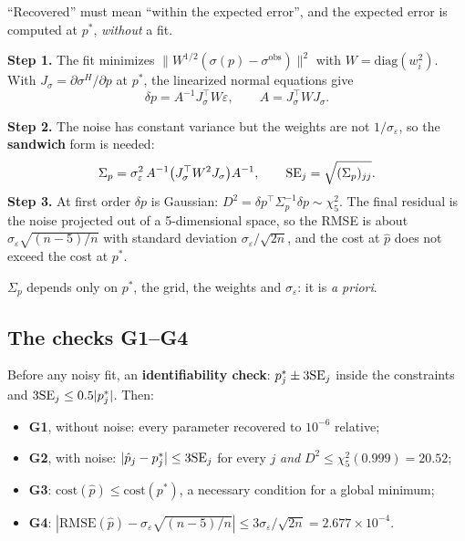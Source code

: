 ``Recovered'' must mean ``within the expected error'', and the expected error is computed at $p^*$, \emph{without} a
fit.

\noindent\textbf{Step 1.} The fit minimizes $\|W^{1/2}(\sigma(p)-\sigma^{\mathrm{obs}})\|^2$ with
$W=\mathrm{diag}(w_i^2)$. With $J_\sigma=\partial\sigma^H/\partial p$ at $p^*$, the linearized normal equations give
\[
\delta p=A^{-1}J_\sigma^\top W\varepsilon,\qquad A=J_\sigma^\top WJ_\sigma .
\]

\noindent\textbf{Step 2.} The noise has constant variance but the weights are not $1/\sigma_\varepsilon$, so the
\textbf{sandwich} form is needed:
\begin{equation}\label{eq:cal-sandwich}
\Sigma_p=\sigma_\varepsilon^2\,A^{-1}\big(J_\sigma^\top W^2J_\sigma\big)A^{-1},\qquad \mathrm{SE}_j=\sqrt{(\Sigma_p)_{jj}}.
\end{equation}
\noindent\textbf{Step 3.} At first order $\delta p$ is Gaussian: $D^2=\delta p^\top\Sigma_p^{-1}\delta p\sim\chi^2_5$.
The final residual is the noise projected out of a 5-dimensional space, so the RMSE is about
$\sigma_\varepsilon\sqrt{(n-5)/n}$ with standard deviation $\sigma_\varepsilon/\sqrt{2n}$, and the cost at $\hat p$
does not exceed the cost at $p^*$.

$\Sigma_p$ depends only on $p^*$, the grid, the weights and $\sigma_\varepsilon$: it is \emph{a priori}.

\subsection{The checks G1--G4}
Before any noisy fit, an \textbf{identifiability check}: $p^*_j\pm3\mathrm{SE}_j$ inside the constraints and
$3\mathrm{SE}_j\le0.5|p^*_j|$. Then:
\begin{itemize}
\item \textbf{G1}, without noise: every parameter recovered to $10^{-6}$ relative;
\item \textbf{G2}, with noise: $|\hat p_j-p^*_j|\le3\mathrm{SE}_j$ for every $j$ \emph{and} $D^2\le\chi^2_5(0.999)=20.52$;
\item \textbf{G3}: $\text{cost}(\hat p)\le\text{cost}(p^*)$, a necessary condition for a global minimum;
\item \textbf{G4}: $|\mathrm{RMSE}(\hat p)-\sigma_\varepsilon\sqrt{(n-5)/n}|\le3\sigma_\varepsilon/\sqrt{2n}=2.677\times10^{-4}$.
\end{itemize}

